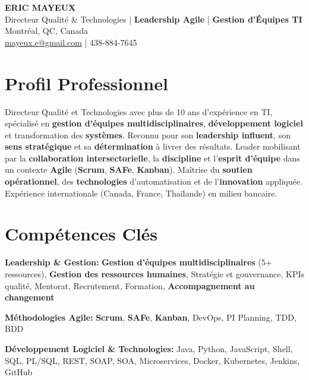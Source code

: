 \documentclass[11pt,a4paper]{article}
\newcommand{\highlight}[1]{\textbf{#1}}
\begin{document}
\begin{center}
    {\Huge \textbf{ERIC MAYEUX}}\\
    \vspace{3pt}
    {\large Directeur Qualit\'{e} \& Technologies | \highlight{Leadership Agile} | \highlight{Gestion d'\'{E}quipes TI}}\\
    \vspace{3pt}
    Montr\'{e}al, QC, Canada\\
    \href{mailto:mayeux.e@gmail.com}{mayeux.e@gmail.com} | 438-884-7645
\end{center}

\vspace{6pt}

\section*{Profil Professionnel}
\noindent
Directeur Qualit\'{e} et Technologies avec plus de 10 ans d'exp\'{e}rience en TI, sp\'{e}cialis\'{e} en \highlight{gestion d'\'{e}quipes multidisciplinaires}, \highlight{d\'{e}veloppement logiciel} et transformation des \highlight{syst\`{e}mes}. Reconnu pour son \highlight{leadership influent}, son \highlight{sens strat\'{e}gique} et sa \highlight{d\'{e}termination} \`{a} livrer des r\'{e}sultats. Leader mobilisant par la \highlight{collaboration intersectorielle}, la \highlight{discipline} et l'\highlight{esprit d'\'{e}quipe} dans un contexte \highlight{Agile} (\highlight{Scrum}, \highlight{SAFe}, \highlight{Kanban}). Ma\^{i}trise du \highlight{soutien op\'{e}rationnel}, des \highlight{technologies} d'automatisation et de l'\highlight{innovation} appliqu\'{e}e. Exp\'{e}rience internationale (Canada, France, Tha\"{i}lande) en milieu bancaire.

\section*{Comp\'{e}tences Cl\'{e}s}

\textbf{Leadership \& Gestion:} \highlight{Gestion d'\'{e}quipes multidisciplinaires} (5+ ressources), \highlight{Gestion des ressources humaines}, Strat\'{e}gie et gouvernance, KPIs qualit\'{e}, Mentorat, Recrutement, Formation, \highlight{Accompagnement au changement}

\textbf{M\'{e}thodologies Agile:} \highlight{Scrum}, \highlight{SAFe}, \highlight{Kanban}, DevOps, PI Planning, TDD, BDD

\textbf{D\'{e}veloppement Logiciel \& Technologies:} Java, Python, JavaScript, Shell, SQL, PL/SQL, REST, SOAP, SOA, Microservices, Docker, Kubernetes, Jenkins, GitHub
\end{document}
